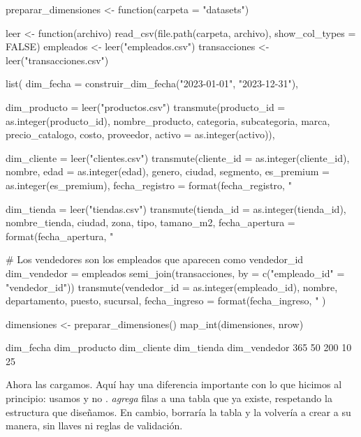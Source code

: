 \begin{rcode}
preparar_dimensiones <- function(carpeta = "datasets") {
  leer <- function(archivo) {
    read_csv(file.path(carpeta, archivo), show_col_types = FALSE)
  }
  empleados     <- leer("empleados.csv")
  transacciones <- leer("transacciones.csv")

  list(
    dim_fecha = construir_dim_fecha("2023-01-01", "2023-12-31"),

    dim_producto = leer("productos.csv") %
      transmute(producto_id = as.integer(producto_id), nombre_producto,
                categoria, subcategoria, marca, precio_catalogo, costo,
                proveedor, activo = as.integer(activo)),

    dim_cliente = leer("clientes.csv") %
      transmute(cliente_id = as.integer(cliente_id), nombre,
                edad = as.integer(edad), genero, ciudad,
                segmento, es_premium = as.integer(es_premium),
                fecha_registro = format(fecha_registro, "%

    dim_tienda = leer("tiendas.csv") %
      transmute(tienda_id = as.integer(tienda_id), nombre_tienda, ciudad,
                zona, tipo, tamano_m2,
                fecha_apertura = format(fecha_apertura, "%

    # Los vendedores son los empleados que aparecen como vendedor_id
    dim_vendedor = empleados %
      semi_join(transacciones, by = c("empleado_id" = "vendedor_id")) %
      transmute(vendedor_id = as.integer(empleado_id), nombre,
                departamento, puesto, sucursal,
                fecha_ingreso = format(fecha_ingreso, "%
  )
}

dimensiones <- preparar_dimensiones()
map_int(dimensiones, nrow)
\end{rcode}

\begin{rsalida}
   dim_fecha dim_producto  dim_cliente   dim_tienda dim_vendedor 
         365           50          200           10           25 
\end{rsalida}

Ahora las cargamos. Aquí hay una diferencia importante con lo que hicimos al
principio: usamos  y no .
 \emph{agrega} filas a una tabla que ya existe,
respetando la estructura que diseñamos. En cambio,
 borraría la tabla y la
volvería a crear a su manera, sin llaves ni reglas de validación.

